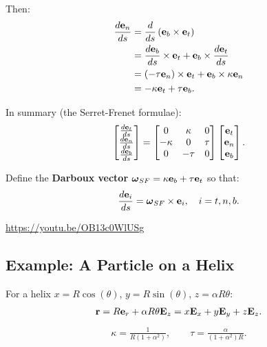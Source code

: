 \documentclass[
  letterpaper,
  DIV=11,
  numbers=noendperiod]{scrreprt}
\newcommand{\lp}{\left(}
\newcommand{\rp}{\right)}
\newcommand{\bomega}{\boldsymbol{\omega}}
\begin{document}
Then: \begin{align}
    \frac{d{\bf e}_n}{ds} &= \frac{d}{ds}\lp{\bf e}_b\times{\bf e}_t\rp\\
    &= \frac{d{\bf e}_b}{ds}\times{\bf e}_t+{\bf e}_b\times\frac{d{\bf e}_t}{ds}\\
    &= (-\tau{\bf e}_n)\times{\bf e}_t+{\bf e}_b\times\kappa{\bf e}_n\\
    &= -\kappa{\bf e}_t+\tau{\bf e}_b.
\end{align}

In summary (the Serret-Frenet formulae): \begin{align}
    \begin{bmatrix}
        \frac{d{\bf e}_t}{ds}\\
        \frac{d{\bf e}_n}{ds}\\
        \frac{d{\bf e}_b}{ds}
    \end{bmatrix}
    =
    \begin{bmatrix}
        0 & \kappa & 0\\
        -\kappa & 0 & \tau\\
        0 & -\tau & 0
    \end{bmatrix}
    \begin{bmatrix}
        {\bf e}_t\\
        {\bf e}_n\\
        {\bf e}_b
    \end{bmatrix}.
\end{align}

Define the \textbf{Darboux vector}
\(\bomega_{SF} = \kappa{\bf e}_b+\tau{\bf e}_t\) so that: \begin{align}
    \frac{d{\bf e}_i}{ds} = \bomega_{SF}\times{\bf e}_i, \quad i = t, n, b.
\end{align}

\url{https://youtu.be/OB13c0WlUSg}

\subsection{Example: A Particle on a
Helix}\label{example-a-particle-on-a-helix}

For a helix \(x=R\cos(\theta)\), \(y=R\sin(\theta)\),
\(z=\alpha R\theta\): \begin{align}
    {\bf r} = R{\bf e}_r+\alpha R\theta{\bf E}_z = x{\bf E}_x+y{\bf E}_y+z{\bf E}_z.
\end{align} \begin{align}
    \kappa = \frac{1}{R(1+\alpha^2)}, \qquad \tau = \frac{\alpha}{(1+\alpha^2)R}.
\end{align}
\end{document}
